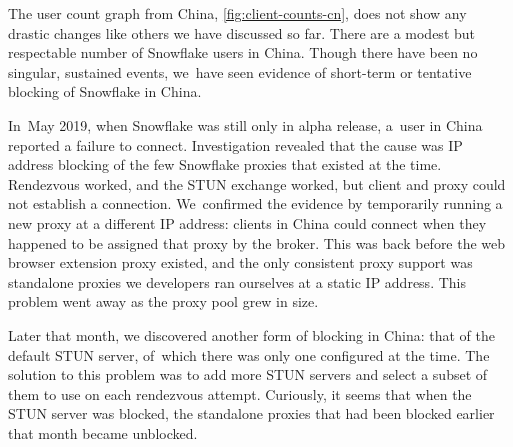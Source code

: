 \documentclass[letterpaper,twocolumn]{article}
\begin{document}
The user count graph from China,
\autoref{fig:client-counts-cn},
does not show any drastic changes
like others we have discussed so far.
There are a modest but respectable number of Snowflake users in China.
Though there have been no singular, sustained events,
we~have seen evidence of short-term or tentative
blocking of Snowflake in China.

In~May 2019, when Snowflake was still only in alpha release,
a~user in China reported a failure to connect.
Investigation revealed that the cause was IP address blocking of
the few Snowflake proxies that existed at the time.
Rendezvous worked, and the STUN exchange worked,
but client and proxy could not establish a connection.
We~confirmed the evidence by temporarily running a new proxy
at a different IP address:
clients in China could connect when they happened to be assigned
that proxy by the broker.
This was back before the web browser extension proxy existed,
and the only consistent proxy support was standalone proxies
we developers ran ourselves at a static IP address.
This problem went away as the proxy pool grew in size.

Later that month, we discovered another form of blocking in China:
that of the default STUN server,
of~which there was only one configured at the time.
The solution to this problem was to add more STUN servers
and select a subset of them to use on each rendezvous attempt.
Curiously, it seems that when the STUN server was blocked,
the standalone proxies that had been blocked earlier that month became unblocked.
\end{document}
